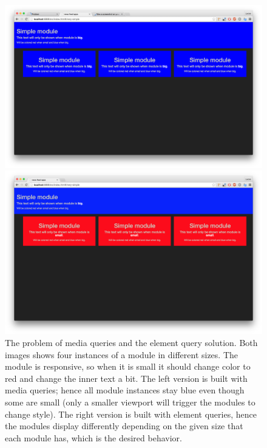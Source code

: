 \documentclass[a4paper,11pt]{kth-mag}
\begin{document}
      \begin{figure}
        \centering
        \begin{minipage}{.5\textwidth}
          \centering
          \includegraphics[width=\linewidth]{images/mq-big}
        \end{minipage}%
        \begin{minipage}{.5\textwidth}
          \centering
          \includegraphics[width=\linewidth]{images/eq-big}
        \end{minipage}
        \caption{
          The problem of media queries and the element query solution.
          Both images shows four instances of a module in different sizes.
          The module is responsive, so when it is small it should change color to red and change the inner text a bit.
          The left version is built with media queries; hence all module instances stay blue even though some are small (only a smaller viewport will trigger the modules to change style).
          The right version is built with element queries, hence the modules display differently depending on the given size that each module has, which is the desired behavior.}
        \label{fig:mq-vs-eq}
      \end{figure}
\end{document}
